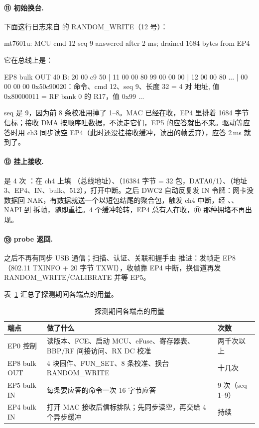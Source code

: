\paragraph{⑪ 初始换台.} 下面这行日志来自  的 RANDOM\_WRITE（12 号）：
\begin{txtcode}
mt7601u: MCU cmd 12 seq 9 answered after 2 ms; drained 1684 bytes from EP4
\end{txtcode}
它在总线上是：
\begin{txtcode}
EP8  bulk OUT 40 B:  20 00 c9 50 | 11 00 00 80 99 00 00 00 | 12 00 00 80 ... | 00 00 00 00
                     0x50c90020：命令、cmd 12、seq 9、长度 32 = 4 对 {地址, 值}
                     0x80000011 = RF bank 0 的 R17，值 0x99 ...
\end{txtcode}
seq 是 9，因为前 8 条校准用掉了 1--8。MAC 已经在收，EP4 里排着 1684 字节信标；接收 DMA 按顺序吐数据，不读走它们，EP5 的应答就出不来。驱动等应答时用 ch3 同步读空 EP4（此时还没挂接收缓冲，读出的帧丢弃），应答 2\,ms 就到了。

\paragraph{⑫ 挂上接收.}  是 4 次 ：在 ch4 上填 （总线地址）、（16384 字节 = 32 包，DATA0/1）、（地址 3、EP4、IN、bulk、512），打开中断。之后 DWC2 自动反复发 IN 令牌：网卡没数据回 NAK，有数据就送一个以短包结尾的聚合包，触发 ch4 中断，经 、、NAPI 到  拆帧，随即重挂。4 个缓冲轮转，EP4 总有人在收，⑪ 那种拥堵不再出现。

\paragraph{⑬ probe 返回.}  之后不再有同步 USB 通信；扫描、认证、关联和握手由  推进：发帧走 EP8（802.11 TXINFO + 20 字节 TXWI），收帧靠 EP4 中断，换信道再发 RANDOM\_WRITE/CALIBRATE 并等 EP5。

表~\ref{tab:mt7601u-epuse} 汇总了探测期间各端点的用量。

\begin{table}[htbp]
  \centering
  \caption{探测期间各端点的用量}
  \label{tab:mt7601u-epuse}
  \small
  \begin{tabularx}{\linewidth}{@{}lXl@{}}
    \toprule
    端点 & 做了什么 & 次数 \\
    \midrule
    EP0 控制 & 读版本、FCE、启动 MCU、eFuse、寄存器表、BBP/RF 间接访问、RX DC 校准 & 两千次以上 \\
    EP8 bulk OUT & 4 块固件、FUN\_SET、8 条校准、换台 RANDOM\_WRITE & 十几次 \\
    EP5 bulk IN & 每条要应答的命令一次 16 字节应答 & 9 次（seq 1--9） \\
    EP4 bulk IN & 打开 MAC 接收后信标排队；先同步读空，再交给 4 个异步缓冲 & 持续 \\
    \bottomrule
  \end{tabularx}
\end{table}

